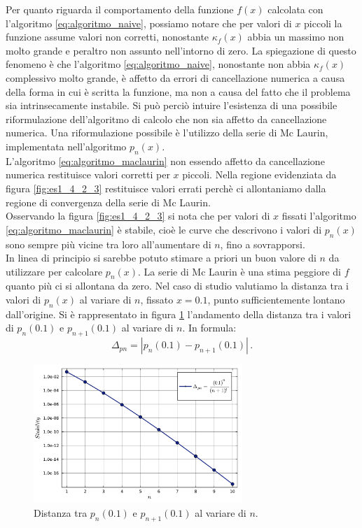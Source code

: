 \documentclass[letterpaper, 12pt]{article}
\numberwithin{equation}{section}    %
\begin{document}
Per quanto riguarda il comportamento della funzione $f(x)$ calcolata con l'algoritmo \ref{eq:algoritmo_naive},
possiamo notare che per valori di $x$ piccoli la funzione assume valori non corretti, nonostante $\kappa_f(x)$ 
abbia un massimo non molto
grande e peraltro non assunto nell'intorno di zero. La spiegazione di questo fenomeno è che l'algoritmo
\ref{eq:algoritmo_naive}, nonostante non abbia $\kappa_f(x)$ complessivo molto grande, è affetto da errori 
di cancellazione numerica a causa della forma in cui è scritta la funzione, ma non a causa del fatto che 
il problema sia intrinsecamente instabile. Si può perciò intuire l'esistenza di una possibile riformulazione
dell'algoritmo di calcolo che non sia affetto da cancellazione numerica. 
Una riformulazione possibile è l'utilizzo della
serie di Mc Laurin, implementata nell'algoritmo $p_n(x)$. \\
L'algoritmo \ref{eq:algoritmo_maclaurin} non essendo affetto da cancellazione numerica restituisce
valori corretti per $x$ piccoli. Nella regione evidenziata da
figura \ref{fig:es1_4_2_3} restituisce valori errati
perchè ci allontaniamo dalla regione di convergenza della serie di Mc Laurin. \\
Osservando la figura \ref{fig:es1_4_2_3} si nota che per valori di $x$ fissati l'algoritmo 
\ref{eq:algoritmo_maclaurin} è stabile, cioè le curve che descrivono i valori di $p_n(x)$ sono sempre più 
vicine tra loro all'aumentare di $n$, fino a sovrapporsi. \\
In linea di principio si sarebbe potuto stimare a priori un buon valore di $n$ da utilizzare
per calcolare $p_n(x)$. La serie di Mc Laurin è una stima peggiore di $f$ quanto più ci si
allontana da zero. Nel caso di studio valutiamo la distanza tra i valori di $p_n(x)$ al variare di $n$,
fissato $x = 0.1$, punto sufficientemente lontano dall'origine. 
Si è rappresentato in figura \ref{fig:es1_4_2_4} l'andamento della distanza tra i valori
di $p_n(0.1)$ e $p_{n+1}(0.1)$ al variare di $n$. In formula:
\begin{equation}
    \Delta_{pn} = |p_n(0.1) - p_{n+1}(0.1)|\,.
\end{equation}
\begin{figure}[!ht]
    \centering
    \includegraphics[width=0.7\textwidth]{1424.pdf}
    \caption{Distanza tra $p_n(0.1)$ e $p_{n+1}(0.1)$ al variare di $n$.}
    \label{fig:es1_4_2_4}
\end{figure}
\end{document}
